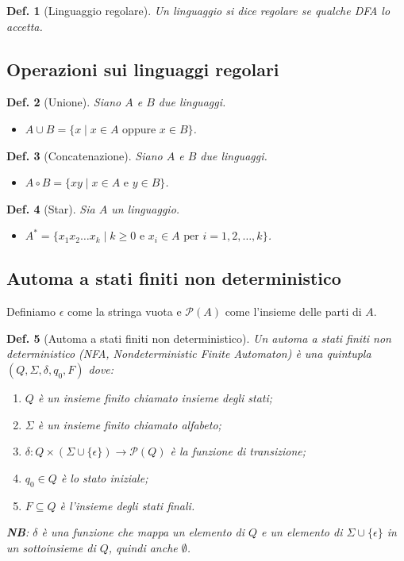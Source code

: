 \documentclass[11pt]{article}
\newtheorem{definition}{Def.}[section]
\begin{document}
\begin{definition}[Linguaggio regolare]
	Un linguaggio si dice regolare se qualche DFA lo accetta.
\end{definition}

\subsection{Operazioni sui linguaggi regolari}

\begin{definition}[Unione]
	Siano $A$ e $B$ due linguaggi.
	\begin{itemize}
		\item[] $A \cup B = \{x \mid x \in A \text{ oppure } x \in B\}$.
	\end{itemize}
\end{definition}

\begin{definition}[Concatenazione]
	Siano $A$ e $B$ due linguaggi.
	\begin{itemize}
		\item[] $A \circ B = \{xy \mid x \in A \text{ e } y \in B\}$.
	\end{itemize}
\end{definition}

\begin{definition}[Star]
	Sia $A$ un linguaggio.
	\begin{itemize}
		\item[] $A^* = \{x_1x_2 \dots x_k \mid k \geq 0 \text{ e } x_i \in A
			\text{ per } i = 1, 2, \dots, k\}$.
	\end{itemize}
\end{definition}

\subsection{Automa a stati finiti non deterministico}

Definiamo $\epsilon$ come la stringa vuota e $\mathcal{P}(A)$ come l'insieme delle parti
di $A$.

\begin{definition}[Automa a stati finiti non deterministico]
	Un automa a stati finiti non deterministico (NFA, Nondeterministic Finite
	Automaton) è una quintupla $(Q, \Sigma, \delta, q_0, F)$ dove:
	\begin{enumerate}
			\item $Q$ è un insieme finito chiamato insieme degli stati;
			\item $\Sigma$ è un insieme finito chiamato alfabeto;
			\item $\delta: Q \times (\Sigma \cup \{\epsilon\}) \rightarrow
				\mathcal{P}(Q)$ è la funzione di transizione;
			\item $q_0 \in Q$ è lo stato iniziale;
			\item $F \subseteq Q$ è l'insieme degli stati finali.
	\end{enumerate}
	\textbf{NB}: $\delta$ è una funzione che mappa un elemento di $Q$ e un
	elemento di $\Sigma \cup \{\epsilon\}$ in un sottoinsieme di $Q$, quindi
	anche $\emptyset$.
\end{definition}
\end{document}
